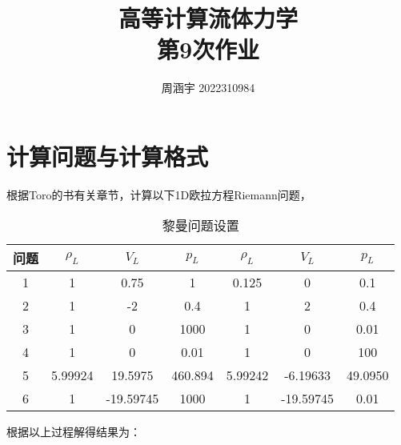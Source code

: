 \documentclass[UTF8,zihao=5]{ctexart} %
\title{{\bfseries\rmfamily\Huge{高等计算流体力学\hspace{1em}\\第9次作业}}}
\author{周涵宇 2022310984}
\date{}
\begin{document}
\maketitle

\section{计算问题与计算格式}

根据Toro的书\cite{2013Riemann}有关章节，计算以下1D欧拉方程Riemann问题，

\begin{table}[H]
    \begin{center}
        \caption{黎曼问题设置}
        \begin{tabular}{|c|c|c|c|c|c|c|}
            \hline
            问题 & $\rho_L$ & $V_L$     & $p_L$   & $\rho_L$ & $V_L$     & $p_L$   \\
            \hline
            1    & 1        & 0.75      & 1       & 0.125    & 0         & 0.1     \\
            \hline
            2    & 1        & -2        & 0.4     & 1        & 2         & 0.4     \\
            \hline
            3    & 1        & 0         & 1000    & 1        & 0         & 0.01    \\
            \hline
            4    & 1        & 0         & 0.01    & 1        & 0         & 100     \\
            \hline
            5    & 5.99924  & 19.5975   & 460.894 & 5.99242  & -6.19633  & 49.0950 \\
            \hline
            6    & 1        & -19.59745 & 1000    & 1        & -19.59745 & 0.01    \\
            \hline
        \end{tabular}
    \end{center}
\end{table}

根据以上过程解得结果为：
\end{document}

